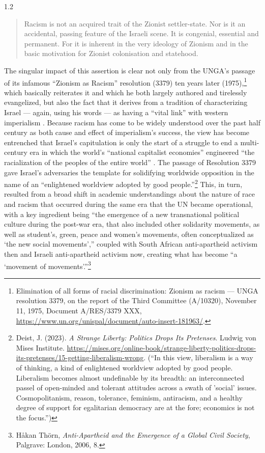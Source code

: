 \documentclass[../unravbook.tex]{subfiles}
\begin{document}
\begin{spacing}{1.2}
\begin{quote}
    Racism is not an acquired trait of the Zionist settler-state. Nor is it an accidental, passing feature of the Israeli scene. It is congenial, essential and permanent. For it is inherent in the very ideology of Zionism and in the basic motivation for Zionist colonisation and statehood.
\end{quote}

The singular impact of this assertion is clear not only from the UNGA's passage of its infamous \enquote{Zionism as Racism} resolution (3379) ten years later (1975),\footnote{Elimination of all forms of racial discrimination: Zionism as racism --- UNGA resolution 3379, on the report of the Third Committee (A/10320), November 11, 1975, Document A/RES/3379 XXX, \url{https://www.un.org/unispal/document/auto-insert-181963/}.} which basically reiterates it and which he both largely authored and tirelessly evangelized, but also the fact that it derives from a tradition of characterizing Israel --- again, using his words --- as having a ``vital link'' with western imperialism \parencite[21]{Sayegh-1965}. Because racism has come to be widely understood over the past half century as both cause and effect of imperialism's success, the view has become entrenched that Israel's capitulation is only the start of a struggle to end a multi-century era in which the world's ``national capitalist economies'' engineered ``the racialization of the peoples of the entire world'' \parencite[89]{Silva-1999}. The passage of Resolution 3379 gave Israel's adversaries the template for solidifying worldwide opposition in the name of an ``enlightened worldview adopted by good people.''\footnote{Deist, J. (2023). \textit{A Strange Liberty: Politics Drops Its Pretenses}. Ludwig von Mises Institute. \url{https://mises.org/online-book/strange-liberty-politics-drops-its-pretenses/15-getting-liberalism-wrong}. (``In this view, liberalism is a way of thinking, a kind of enlightened worldview adopted by good people. Liberalism becomes almost undefinable by its breadth: an interconnected passel of open-minded and tolerant attitudes across a swath of 'social' issues. Cosmopolitanism, reason, tolerance, feminism, antiracism, and a healthy degree of support for egalitarian democracy are at the fore; economics is not the focus.'')} This, in turn, resulted from a broad shift in academic understandings about the nature of race and racism that occurred during the same era that the UN became operational, with a key ingredient being \enquote{the emergence of a new transnational political culture during the post-war era, that also included other solidarity movements, as well as student's, green, peace and women's movements, often conceptualized as \enquote{the new social movements},} coupled with South African anti-apartheid activism then and Israeli anti-apartheid activism now, creating what has become \enquote{a `movement of movements'.}\footnote{Håkan Thörn, \textit{Anti-Apartheid and the Emergence of a Global Civil Society}, Palgrave: London, 2006, 8.} 


\end{spacing}
\end{document}
